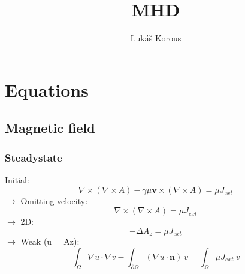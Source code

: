 \documentclass[smallextended]{svjour3}       %
\begin{document}
\title{MHD}


\author{Luk\' a\v s Korous}


\maketitle

\section{Equations}

	\subsection{Magnetic field}
	
		\subsubsection{Steadystate}
		Initial:
		\begin{equation}
			\nabla \times \left(\nabla \times A \right) - \gamma \mu \mathbf{v} \times \left( \nabla \times A \right) = \mu J_{ext}
		\end{equation}
		$\rightarrow$ Omitting velocity:
		\begin{equation}
			\nabla \times \left(\nabla \times A \right) = \mu J_{ext}
		\end{equation}
		$\rightarrow$ 2D:
		\begin{equation}
			-\Delta A_z = \mu J_{ext}
		\end{equation}
		$\rightarrow$ Weak (u = Az):
		\begin{equation}
			\int_{\Omega}\nabla u \cdot \nabla v - \int_{\partial \Omega} \left(\nabla u \cdot \mathbf{n}\right)\ v = \int_{\Omega} \mu J_{ext} \ v
		\end{equation}
		
	
\end{document}
